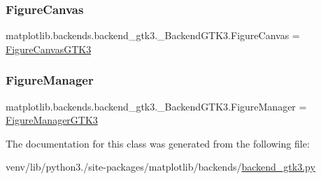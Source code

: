 \subsubsection{\texorpdfstring{Figure\+Canvas}{FigureCanvas}}
{\footnotesize\ttfamily matplotlib.\+backends.\+backend\+\_\+gtk3.\+\_\+\+Backend\+G\+T\+K3.\+Figure\+Canvas = \hyperlink{classmatplotlib_1_1backends_1_1backend__gtk3_1_1FigureCanvasGTK3}{Figure\+Canvas\+G\+T\+K3}\hspace{0.3cm}{\ttfamily [static]}}

\mbox{\label{classmatplotlib_1_1backends_1_1backend__gtk3_1_1__BackendGTK3_a8b4c19bea195e179b261c6dc35193975}} 
\subsubsection{\texorpdfstring{Figure\+Manager}{FigureManager}}
{\footnotesize\ttfamily matplotlib.\+backends.\+backend\+\_\+gtk3.\+\_\+\+Backend\+G\+T\+K3.\+Figure\+Manager = \hyperlink{classmatplotlib_1_1backends_1_1backend__gtk3_1_1FigureManagerGTK3}{Figure\+Manager\+G\+T\+K3}\hspace{0.3cm}{\ttfamily [static]}}



The documentation for this class was generated from the following file\+:\begin{DoxyCompactItemize}
\item 
venv/lib/python3./site-\/packages/matplotlib/backends/\hyperlink{backend__gtk3_8py}{backend\+\_\+gtk3.\+py}\end{DoxyCompactItemize}
